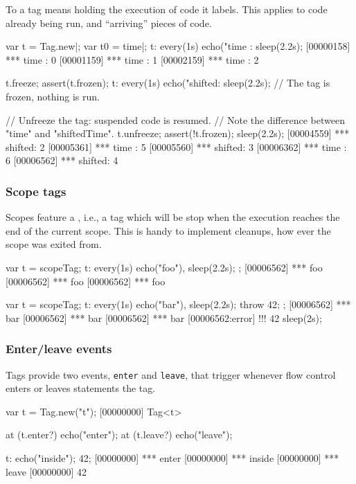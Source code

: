 To  a tag means holding the execution of code it labels.
This applies to code already being run, and ``arriving'' pieces of code.

\begin{urbiscript}[firstnumber=1]
var t = Tag.new|;
var t0 = time|;
t: every(1s) echo("time   : %
sleep(2.2s);
[00000158] *** time   : 0
[00001159] *** time   : 1
[00002159] *** time   : 2

t.freeze;
assert(t.frozen);
t: every(1s) echo("shifted: %
sleep(2.2s);
// The tag is frozen, nothing is run.

// Unfreeze the tag: suspended code is resumed.
// Note the difference between "time" and "shiftedTime".
t.unfreeze;
assert(!t.frozen);
sleep(2.2s);
[00004559] *** shifted: 2
[00005361] *** time   : 5
[00005560] *** shifted: 3
[00006362] *** time   : 6
[00006562] *** shifted: 4
\end{urbiscript}


\subsubsection{Scope tags}
\label{sec:specs:tag:scope}

Scopes feature a , i.e., a tag which will be stop
when the execution reaches the end of the current scope.  This is
handy to implement cleanups, how ever the scope was exited from.

\begin{urbiscript}[firstnumber=1]
{
  var t = scopeTag;
  t: every(1s)
      echo("foo"),
  sleep(2.2s);
};
[00006562] *** foo
[00006562] *** foo
[00006562] *** foo

{
  var t = scopeTag;
  t: every(1s)
      echo("bar"),
  sleep(2.2s);
  throw 42;
};
[00006562] *** bar
[00006562] *** bar
[00006562] *** bar
[00006562:error] !!! 42
sleep(2s);
\end{urbiscript}

\subsubsection{Enter/leave events}
\label{sec:specs:tag:enter-leave}

Tags provide two events, \lstinline|enter| and \lstinline|leave|, that
trigger whenever flow control enters or leaves statements the tag.

\begin{urbiscript}[firstnumber=1]
var t = Tag.new("t");
[00000000] Tag<t>

at (t.enter?)
  echo("enter");
at (t.leave?)
  echo("leave");

t: {echo("inside"); 42};
[00000000] *** enter
[00000000] *** inside
[00000000] *** leave
[00000000] 42
\end{urbiscript}

